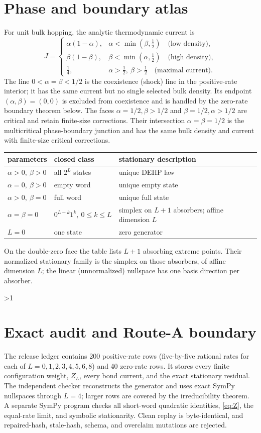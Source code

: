 \documentclass[11pt]{article}
\begin{document}
\section{Phase and boundary atlas}
For unit bulk hopping, the analytic thermodynamic current is
\[
J=\begin{cases}
\alpha(1-\alpha),&\alpha<\min(\beta,\frac12)
       \quad\text{(low density)},\\
\beta(1-\beta),&\beta<\min(\alpha,\frac12)
       \quad\text{(high density)},\\
\frac14,&\alpha>\frac12,\ \beta>\frac12
       \quad\text{(maximal current)}.
\end{cases}
\]
The line $0<\alpha=\beta<1/2$ is the coexistence (shock) line in the
positive-rate interior; it has the same current but no single selected bulk
density.  Its endpoint $(\alpha,\beta)=(0,0)$ is excluded from coexistence
and is handled by the zero-rate boundary theorem below.  The faces
$\alpha=1/2,\beta>1/2$ and $\beta=1/2,\alpha>1/2$ are critical and retain
finite-size corrections.  Their intersection $\alpha=\beta=1/2$ is the
multicritical phase-boundary junction and has the same bulk density and
current with finite-size critical corrections.

\begin{center}
\small
\begin{tabular}{@{}lll@{}}
\toprule
parameters & closed class & stationary description\\
\midrule
$\alpha>0,\ \beta>0$ & all $2^L$ states & unique DEHP law\\
$\alpha=0,\ \beta>0$ & empty word & unique empty state\\
$\alpha>0,\ \beta=0$ & full word & unique full state\\
$\alpha=\beta=0$ & $0^{L-k}1^k,\ 0\leq k\leq L$ & simplex on $L+1$ absorbers; affine dimension $L$\\
$L=0$ & one state & zero generator\\
\bottomrule
\end{tabular}
\end{center}
On the double-zero face the table lists $L+1$ absorbing extreme points.  Their
normalized stationary family is the simplex on those absorbers, of affine
dimension $L$; the linear (unnormalized) nullspace has one basis direction per
absorber.
\fi

\ifnum\CRevisionRound>1
\section{Exact audit and Route-A boundary}
The release ledger contains 200 positive-rate rows (five-by-five rational
rates for each of $L=0,1,2,3,4,5,6,8$) and 40 zero-rate rows.  It stores
every finite configuration weight, $Z_L$, every bond current, and the exact
stationary residual.  The independent checker reconstructs the generator and
uses exact SymPy nullspaces through $L=4$; larger rows are covered by the
irreducibility theorem.  A separate SymPy program checks all short-word
quadratic identities, \eqref{eq:Z}, the equal-rate limit, and symbolic
stationarity.  Clean replay is byte-identical, and repaired-hash, stale-hash,
schema, and overclaim mutations are rejected.
\end{document}
